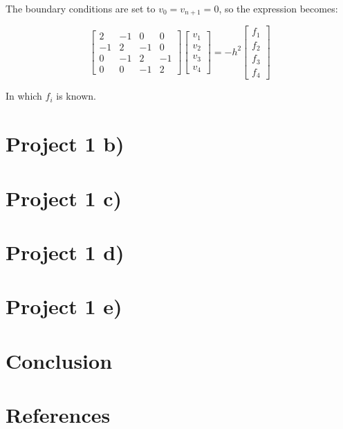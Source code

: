 \documentclass{article}
\begin{document}
The boundary conditions are set to $v_0 = v_{n+1} = 0$, so the expression becomes: 

\[
\begin{bmatrix}
	2 & -1 & 0 & 0 \\
	-1 & 2 & -1 & 0 \\
	0 & -1 & 2 & -1 \\
	0 & 0 & -1 & 2
\end{bmatrix}
\begin{bmatrix}
	v_1 \\  v_2 \\ v_3 \\ v_4
\end{bmatrix}
	= -h^2
\begin{bmatrix}
	f_1 \\
	f_2 \\
	f_3 \\
	f_4
\end{bmatrix}
\]

In which $f_i$ is known. 

\section{Project 1 b)}

\section{Project 1 c)}

\section{Project 1 d)}

\section{Project 1 e)}


\section{Conclusion}

\section{References}
\end{document}
